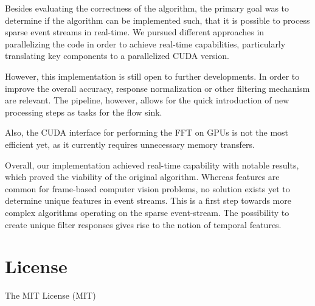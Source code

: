 \documentclass[a4paper,twoside, openright,12pt]{report}
\begin{document}
Besides evaluating the correctness of the algorithm, the primary goal was to determine if the algorithm can be implemented such, that it is possible to process sparse event streams in real-time.
We pursued different approaches in parallelizing the code in order to achieve real-time capabilities, particularly translating key components to a parallelized CUDA version.

However, this implementation is still open to further developments.
In order to improve the overall accuracy, response normalization or other filtering mechanism are relevant.
The pipeline, however, allows for the quick introduction of new processing steps as tasks for the flow sink.

Also, the CUDA interface for performing the FFT on GPUs is not the most efficient yet, as it currently requires unnecessary memory transfers.

Overall, our implementation achieved real-time capability with notable results, which proved the viability of the original algorithm.
Whereas features are common for frame-based computer vision problems, no solution exists yet to determine unique features in event streams.
This is a first step towards more complex algorithms operating on the sparse event-stream.
The possibility to create unique filter responses gives rise to the notion of temporal features.







\cleardoublepage
{}
\listoffigures 	 %


\cleardoublepage
{}




\cleardoublepage
\chapter*{License}
The MIT License (MIT)\\
\end{document}
